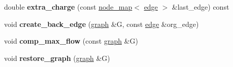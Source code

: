 \begin{DoxyCompactItemize}
\item 
\mbox{\label{classmaxflow__ff_a410a7c5b9b75225ec0a48402dc2f6555}} 
double {\bfseries extra\+\_\+charge} (const \mbox{\hyperlink{classnode__map}{node\+\_\+map}}$<$ \mbox{\hyperlink{classedge}{edge}} $>$ \&last\+\_\+edge) const
\item 
\mbox{\label{classmaxflow__ff_aea04831f46fb86990c9ba21fb19d0382}} 
void {\bfseries create\+\_\+back\+\_\+edge} (\mbox{\hyperlink{classgraph}{graph}} \&G, const \mbox{\hyperlink{classedge}{edge}} \&org\+\_\+edge)
\item 
\mbox{\label{classmaxflow__ff_a560d27c4c62b46dcb0a36ac60ebc1efb}} 
void {\bfseries comp\+\_\+max\+\_\+flow} (const \mbox{\hyperlink{classgraph}{graph}} \&G)
\item 
\mbox{\label{classmaxflow__ff_a31a13c79918964a49fa18b4eb514c584}} 
void {\bfseries restore\+\_\+graph} (\mbox{\hyperlink{classgraph}{graph}} \&G)
\end{DoxyCompactItemize}

